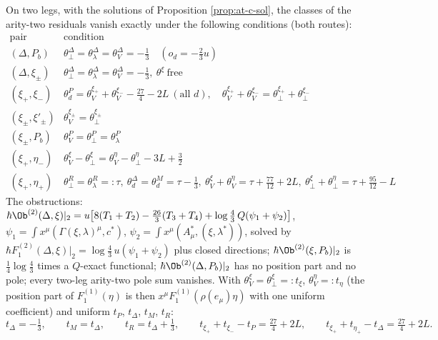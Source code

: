 \begin{proposition}
\label{prop:at-c-ar2}
On two legs, with the solutions of Proposition \ref{prop:at-c-sol}, the classes of the arity-two residuals vanish exactly under the following conditions (both routes):
\[
\begin{array}{l|l}
\text{pair} & \text{condition}\\
\hline
(\Delta,P_b) & \theta^\Delta_\perp=\theta^\Delta_\lambda=\theta^\Delta_V=-\tfrac13\quad(o_d=-\tfrac23u)\\
(\Delta,\xi_\pm) & \theta^\Delta_\perp=\theta^\Delta_\lambda=\theta^\Delta_V=-\tfrac13,\ \theta^\xi\ \text{free}\\
(\xi_+,\xi_-) & \theta^P_d=\theta^{\xi_+}_V+\theta^{\xi_-}_V-\tfrac{27}4-2L\ (\text{all }d),\quad \theta^{\xi_+}_V+\theta^{\xi_-}_V=\theta^{\xi_+}_\perp+\theta^{\xi_-}_\perp\\
(\xi_\pm,\xi'_\pm) & \theta^{\xi_\pm}_V=\theta^{\xi_\pm}_\perp\\
(\xi_\pm,P_b) & \theta^P_V=\theta^P_\perp=\theta^P_\lambda\\
(\xi_+,\eta_-) & \theta^\xi_V-\theta^\xi_\perp=\theta^\eta_V-\theta^\eta_\perp-3L+\tfrac32\\
(\xi_+,\eta_+) & \theta^R_\perp=\theta^R_\lambda=:\tau,\ \theta^\Delta_d=\theta^M_d=\tau-\tfrac13,\ \theta^\xi_V+\theta^\eta_V=\tau+\tfrac{77}{12}+2L,\ \theta^\xi_\perp+\theta^\eta_\perp=\tau+\tfrac{95}{12}-L
\end{array}
\]
The obstructions: $\hbar\Ob^{(2)}(\Delta,\xi)|_2=u\big[8(T_1+T_2)-\tfrac{26}3(T_3+T_4)+\log\tfrac43\,Q(\psi_1+\psi_2)\big]$, $\psi_1=\int x^\mu(\Gamma(\xi,\lambda)^\mu,c^*)$, $\psi_2=\int x^\mu(A^*_\mu,(\xi,\lambda^*))$, solved by $\hbar F_1^{(2)}(\Delta,\xi)|_2=\log\tfrac43\,u(\psi_1+\psi_2)$ plus closed directions; $\hbar\Ob^{(2)}(\xi,P_b)|_2$ is $\tfrac14\log\tfrac43$ times a $Q$-exact functional; $\hbar\Ob^{(2)}(\Delta,P_b)|_2$ has no position part and no pole; every two-leg arity-two pole sum vanishes. With $\theta^\xi_V=\theta^\xi_\perp=:t_\xi$, $\theta^\eta_V=:t_\eta$ (the position part of $F_1^{(1)}(\eta)$ is then $x^\mu F_1^{(1)}(\rho(e_\mu)\eta)$ with one uniform coefficient) and uniform $t_P$, $t_\Delta$, $t_M$, $t_R$:
\[
t_\Delta=-\tfrac13,\qquad t_M=t_\Delta,\qquad t_R=t_\Delta+\tfrac13,\qquad t_{\xi_+}+t_{\xi_-}-t_P=\tfrac{27}4+2L,\qquad t_{\xi_+}+t_{\eta_+}-t_\Delta=\tfrac{27}4+2L .
\]
\end{proposition}

